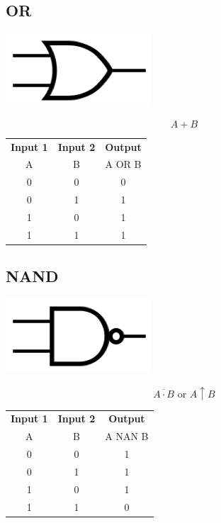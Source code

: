 \documentclass[11pt]{book}
\begin{document}
\newpage

\subsection{OR}
\begin{center}
	\includegraphics{figures/20.03.png}
\end{center}
\begin{equation}
	A + B
\end{equation}
\begin{center}
	\begin{tabular}{c c c}
		\textbf{Input 1} &  \textbf{Input 2} & \textbf{Output} \\
		A & B & A OR B \\
		0 & 0 & 0 \\
		0 & 1 & 1 \\
		1 & 0 & 1 \\
		1 & 1 & 1
	\end{tabular}
\end{center}

\subsection{NAND}
\begin{center}
	\includegraphics{figures/20.04.png}
\end{center}
\begin{equation}
	\overline{A\cdot B} \text{ or } A \uparrow B
\end{equation}
\begin{center}
	\begin{tabular}{c c c}
		\textbf{Input 1} &  \textbf{Input 2} & \textbf{Output} \\
		A & B & A NAN B \\
		0 & 0 & 1 \\
		0 & 1 & 1 \\
		1 & 0 & 1 \\
		1 & 1 & 0
	\end{tabular}
\end{center}
\end{document}
